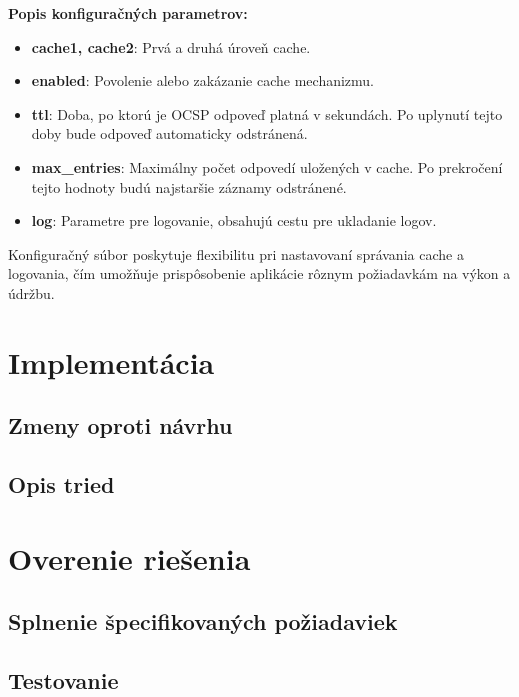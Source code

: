 \documentclass[12pt, twoside]{book}
\begin{document}
\textbf{Popis konfiguračných parametrov:}
\begin{itemize}
\item \textbf{cache1, cache2}: Prvá a druhá úroveň cache.

\item \textbf{enabled}: Povolenie alebo zakázanie cache mechanizmu.

\item \textbf{ttl}: Doba, po ktorú je OCSP odpoveď platná v sekundách. Po uplynutí tejto doby bude odpoveď automaticky odstránená.

\item \textbf{max\_entries}: Maximálny počet odpovedí uložených v cache. Po prekročení tejto hodnoty budú najstaršie záznamy odstránené.

\item \textbf{log}: Parametre pre logovanie, obsahujú cestu pre ukladanie logov.
\end{itemize}

Konfiguračný súbor poskytuje flexibilitu pri nastavovaní správania cache a logovania, čím umožňuje prispôsobenie aplikácie rôznym požiadavkám na výkon a údržbu. 


\section{Implementácia}


\subsection{Zmeny oproti návrhu}


\subsection{Opis tried}


\section{Overenie riešenia}


\subsection{Splnenie špecifikovaných požiadaviek}



\subsection{Testovanie}
\end{document}
